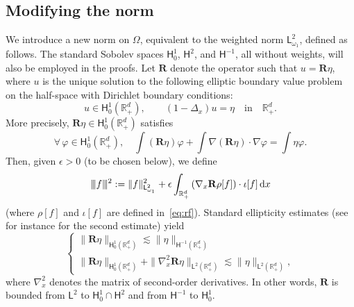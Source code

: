 \documentclass[11pt]{amsart}
\theoremstyle{definition}
\theoremstyle{remark}
\numberwithin{equation}{section}
\newcommand{\Nt}{|\hskip-0.04cm|\hskip-0.04cm|}
\newcommand\R{{\mathbb R}}
\newcommand{\dd}{{\, \mathrm d}}
\newcommand{\sfL}{\mathsf{L}}
\newcommand{\sfH}{\mathsf{H}}
\begin{document}
\subsection{Modifying the norm}

We introduce a new norm on $\Omega$, equivalent to the weighted norm $\sfL^{2}_{\omega_1}$, defined as follows. The standard Sobolev spaces $\sfH^1_0$, $\sfH^2$, and $\sfH^{-1}$, all without weights, will also be employed in the proofs. Let $\mathbf{R}$ denote the operator such that $u = \mathbf{R}\eta$, where $u$ is the unique solution to the following elliptic boundary value problem on the half-space with Dirichlet boundary conditions:
\begin{equation}
  \label{eq:ellipticRu1}
  u \in \sfH^{1}_{0}(\mathbb{R}_+^d), \qquad (1-\Delta_x)u = \eta \quad \text{in} \quad \mathbb{R}_+^d.
\end{equation}
More precisely, $\mathbf R\eta \in \sfH^{1}_{0}(\R_+^d)$ satisfies
\begin{equation}
  \label{eq:ellipticRu2}
  \forall \, \varphi \in \sfH^{1}_{0}(\R_+^d), \quad \int (\mathbf R\eta) \varphi + \int \nabla (\mathbf R\eta) \cdot \nabla \varphi = \int \eta \varphi.
\end{equation}
Then, given $\epsilon>0$ (to be chosen below), we define
\begin{equation}
  \label{eq:mod-norm}
  \Nt f \Nt^2 := \| f \|_{\sfL^2_{\omega_1}} ^2 + \epsilon  \int_{\R_+^d} \left( \nabla_x \mathbf R \rho[f] \right) \cdot \iota[f] \dd x
\end{equation}
(where $\rho[f]$ and $\iota[f]$ are defined in~\eqref{eq:rf}). 
Standard ellipticity estimates (see for instance \cite[Theorem 9.25]{MR2759829} for the second estimate) yield
\begin{equation}
  \label{eq:ellip}
  \begin{cases}
    \| \mathbf R \eta \|_{\sfH^{1}_{0}(\R^d_+)} \lesssim \| \eta \|_{\sfH^{-1}(\R^d_+)} \\[2mm]
    \| \mathbf R \eta \|_{\sfH^{1}_{0}(\R^d_+)} + \| \nabla_x^2 \mathbf R \eta \|_{\sfL^{2}(\R_+^d)} \lesssim \| \eta \|_{\sfL^{2}(\R^d_+)},
  \end{cases}
\end{equation}
where $\nabla_x^2$ denotes the matrix of second-order derivatives. In other words, $\mathbf R$ is bounded from $\sfL^2$ to $\sfH^1_0 \cap \sfH^2$ and from $\sfH^{-1}$ to $\sfH^1_0$.
\end{document}
